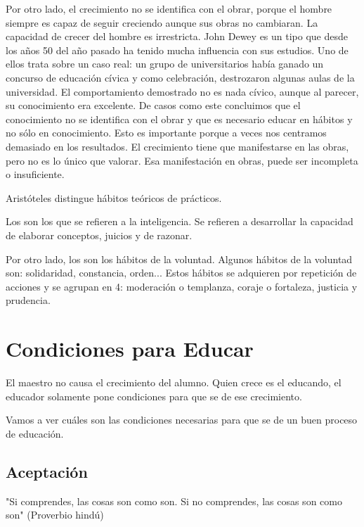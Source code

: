 \documentclass[palatino]{apuntesURJC}
\begin{document}
Por otro lado, el crecimiento no se identifica con el obrar, porque el hombre siempre es capaz de seguir creciendo aunque sus obras no cambiaran. 
%
La capacidad de crecer del hombre es irrestricta.\label{Capacidad_irrestricta}
%
John Dewey es un tipo que desde los años 50 del año pasado ha tenido mucha influencia con sus estudios.
%
Uno de ellos trata sobre un caso real: un grupo de universitarios había ganado un concurso de educación cívica y como celebración, destrozaron algunas aulas de la universidad.
% 
El comportamiento demostrado no es nada cívico, aunque al parecer, su conocimiento era excelente.
%
De casos como este concluimos que el conocimiento no se identifica con el obrar y que es necesario educar en hábitos y no sólo en conocimiento.
%
Esto es importante porque a veces nos centramos demasiado en los resultados.
%
El crecimiento tiene que manifestarse en las obras, pero no es lo único que valorar. Esa manifestación en obras, puede ser incompleta o insuficiente.


Aristóteles distingue hábitos teóricos de prácticos.

Los   son los que se refieren a la inteligencia. Se refieren a  desarrollar la capacidad de elaborar conceptos, juicios y de razonar. 

Por otro lado, los  son los hábitos de la voluntad.
%
Algunos hábitos de la voluntad son: solidaridad, constancia, orden... 
%
Estos hábitos se adquieren por repetición de acciones y se agrupan en 4: moderación o templanza, coraje o fortaleza, justicia y prudencia.




\section{Condiciones para Educar}

El maestro no causa el crecimiento del alumno. Quien crece es el educando, el educador solamente pone condiciones para que se de ese crecimiento.

Vamos a ver cuáles son las condiciones necesarias para que se de un buen proceso de educación.




	\subsection{Aceptación}

	"Si comprendes, las cosas son como son. Si no comprendes, las cosas son como son" (Proverbio hindú)
\end{document}

